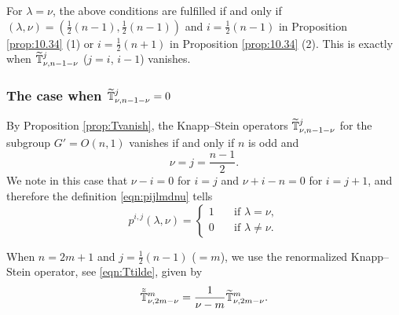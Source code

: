 \begin{remark}
For $\lambda=\nu$, 
 the above conditions are fulfilled 
 if and only if $(\lambda,\nu)=(\frac 1 2 (n-1),\frac 1 2 (n-1))$
 and $i=\frac 1 2 (n-1)$
 in Proposition \ref{prop:10.34} (1) 
 or $i=\frac 1 2 (n+1)$ in Proposition \ref{prop:10.34} (2).  
This is exactly when $\widetilde{{\mathbb{T}}}_{{\nu},{n-1-\nu}}^{{j}}$
 ($j=i$, $i-1$) vanishes.  
\end{remark}

\subsubsection{The case when $\widetilde{{\mathbb{T}}}_{{\nu},{n-1-\nu}}^{{j}}=0$}
\label{subsec:10.6.3}

By Proposition \ref{prop:Tvanish}, 
 the Knapp--Stein operators
 $\widetilde{{\mathbb{T}}}_{{\nu},{n-1-\nu}}^{{j}}$
 for the subgroup $G'=O(n,1)$
 vanishes if and only if $n$ is odd and 
\[
\nu=j=\frac{n-1}2.
\]
We note in this case that 
 $\nu-i=0$ for $i=j$
 and $\nu+i-n=0$ for $i=j+1$, 
 and therefore the definition \eqref{eqn:pijlmdnu} tells
\begin{equation*}
p^{i,j}(\lambda,\nu)
=
\begin{cases}
1 
\quad
&\text{if $\lambda = \nu$}, 
\\
0
\quad
&\text{if $\lambda \ne \nu$}.  
\end{cases}
\end{equation*}

When $n=2m+1$
 and $j= \frac 1 2 (n-1)$ ($=m$), 
 we use the renormalized Knapp--Stein operator, 
 see \eqref{eqn:Ttilde}, 
 given by 
\[
  \tilde{\tilde{{\mathbb{T}}}}_{{\nu},{2m-\nu}}^{{m}} = \frac 1 {\nu-m} \widetilde{{\mathbb{T}}}_{{\nu},{2m-\nu}}^{{m}}.  
\]



